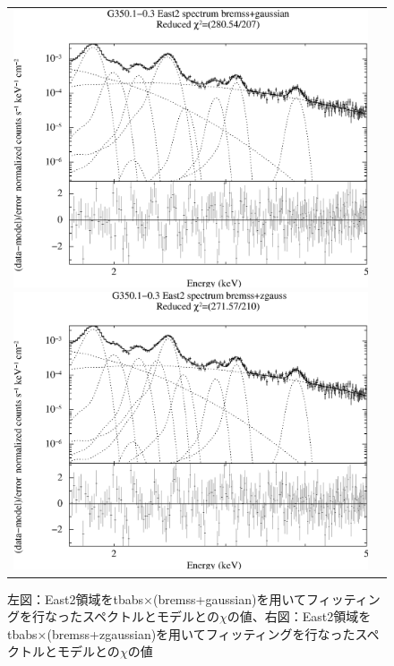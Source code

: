 \documentclass[a4j]{jarticle}%
\begin{document}
\begin{figure}[H]
\begin{center}
\begin{tabular}{cc}

\begin{minipage}{0.5\hsize}
\begin{center}
\includegraphics[scale=0.30]{./ps/East2_bremss+gaussian.eps}
\end{center}
\end{minipage}

\begin{minipage}{0.5\hsize}
\begin{center}
\includegraphics[scale=0.30]{./ps/East2_bremss+zgaussian.eps}
\end{center}
\end{minipage}
\end{tabular}
\caption{左図：East2領域をtbabs$\times$(bremss+gaussian)を用いてフィッティングを行なったスペクトルとモデルとの$\chi$の値、右図：East2領域をtbabs$\times$(bremss+zgaussian)を用いてフィッティングを行なったスペクトルとモデルとの$\chi$の値}
\label{fig:brem_East2}
\end{center}
\end{figure}
\end{document}
